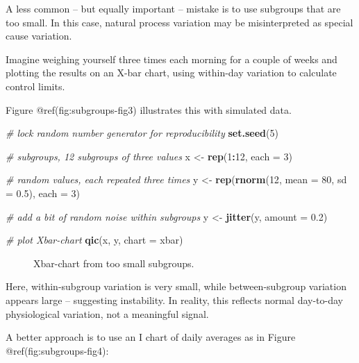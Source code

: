 \documentclass[
]{book}
\makeatletter
\newenvironment{Shaded}{\begin{snugshade}}{\end{snugshade}}
\newcommand{\AttributeTok}[1]{\textcolor[rgb]{0.13,0.29,0.53}{#1}}
\newcommand{\CommentTok}[1]{\textcolor[rgb]{0.56,0.35,0.01}{\textit{#1}}}
\newcommand{\DecValTok}[1]{\textcolor[rgb]{0.00,0.00,0.81}{#1}}
\newcommand{\FloatTok}[1]{\textcolor[rgb]{0.00,0.00,0.81}{#1}}
\newcommand{\FunctionTok}[1]{\textcolor[rgb]{0.13,0.29,0.53}{\textbf{#1}}}
\newcommand{\NormalTok}[1]{#1}
\newcommand{\OtherTok}[1]{\textcolor[rgb]{0.56,0.35,0.01}{#1}}
\newcommand{\SpecialCharTok}[1]{\textcolor[rgb]{0.81,0.36,0.00}{\textbf{#1}}}
\newcommand{\StringTok}[1]{\textcolor[rgb]{0.31,0.60,0.02}{#1}}
\newcommand*\pandocbounded[1]{%
  \sbox\pandoc@box{#1}%
  \Gscale@div\@tempa{\textheight}{\dimexpr\ht\pandoc@box+\dp\pandoc@box\relax}%
  \Gscale@div\@tempb{\linewidth}{\wd\pandoc@box}%
  \ifdim\@tempb\p@<\@tempa\p@\let\@tempa\@tempb\fi%
  \ifdim\@tempa\p@<\p@\scalebox{\@tempa}{\usebox\pandoc@box}%
  \else\usebox{\pandoc@box}%
  \fi%
}
\makeatother
\begin{document}
A less common -- but equally important -- mistake is to use subgroups
that are too small. In this case, natural process variation may be
misinterpreted as special cause variation.

Imagine weighing yourself three times each morning for a couple of weeks
and plotting the results on an X-bar chart, using within-day variation
to calculate control limits.

Figure @ref(fig:subgroups-fig3) illustrates this with simulated data.

\begin{Shaded}
\begin{Highlighting}[]
\CommentTok{\# lock random number generator for reproducibility}
\FunctionTok{set.seed}\NormalTok{(}\DecValTok{5}\NormalTok{)}

\CommentTok{\# subgroups, 12 subgroups of three values}
\NormalTok{x }\OtherTok{\textless{}{-}} \FunctionTok{rep}\NormalTok{(}\DecValTok{1}\SpecialCharTok{:}\DecValTok{12}\NormalTok{, }\AttributeTok{each =} \DecValTok{3}\NormalTok{)}

\CommentTok{\# random values, each repeated three times}
\NormalTok{y }\OtherTok{\textless{}{-}} \FunctionTok{rep}\NormalTok{(}\FunctionTok{rnorm}\NormalTok{(}\DecValTok{12}\NormalTok{, }\AttributeTok{mean =} \DecValTok{80}\NormalTok{, }\AttributeTok{sd =} \FloatTok{0.5}\NormalTok{), }\AttributeTok{each =} \DecValTok{3}\NormalTok{)}

\CommentTok{\# add a bit of random noise within subgroups}
\NormalTok{y }\OtherTok{\textless{}{-}} \FunctionTok{jitter}\NormalTok{(y, }\AttributeTok{amount =} \FloatTok{0.2}\NormalTok{)}

\CommentTok{\# plot Xbar{-}chart}
\FunctionTok{qic}\NormalTok{(x, y, }\AttributeTok{chart =} \StringTok{\textquotesingle{}xbar\textquotesingle{}}\NormalTok{)}
\end{Highlighting}
\end{Shaded}

\begin{figure}
\centering
\pandocbounded{}
\caption{Xbar-chart from too small subgroups.}
\end{figure}

Here, within-subgroup variation is very small, while between-subgroup
variation appears large -- suggesting instability. In reality, this
reflects normal day-to-day physiological variation, not a meaningful
signal.

A better approach is to use an I chart of daily averages as in Figure
@ref(fig:subgroups-fig4):
\end{document}
